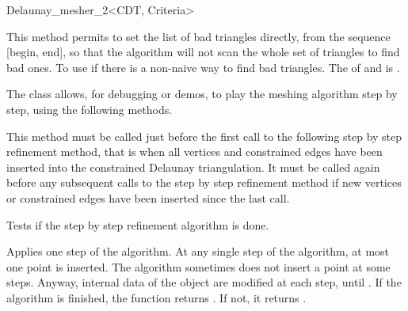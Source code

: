 \begin{ccRefClass}{Delaunay_mesher_2<CDT, Criteria>}
\begin{ccAdvanced}
                   { This method permits to set the list of bad triangles
                     directly, from the sequence [begin, end], so that the
                     algorithm will not scan the whole set of triangles to
                     find bad ones. To use if there is a non-naive way to
                     find bad triangles.  \ccRequire The 
                     of  and  is .}

\end{ccAdvanced}


\begin{ccAdvanced}

The \ccRefName{} class allows, for debugging or demos, to play the
meshing algorithm step by step, using the following methods.

         { This method must be called just before the first
             call to the following step by step refinement method,
             that is when all vertices and constrained edges have been
             inserted into the constrained Delaunay triangulation. It
             must be called again before any subsequent calls to the
             step by step refinement method if new vertices or constrained
             edges have been inserted since the last call.}

         {  Tests if the step by step refinement algorithm is done. }

         { Applies one step of the algorithm. At any single step of the
         algorithm, 
         at most one point is inserted. The algorithm sometimes does not
         insert a point at some steps. Anyway, internal data of the
         \ccRefName{} object are modified at each step, until
         . If the algorithm is finished,
         the function returns . If not, it returns .}

\end{ccAdvanced}

\end{ccRefClass}


